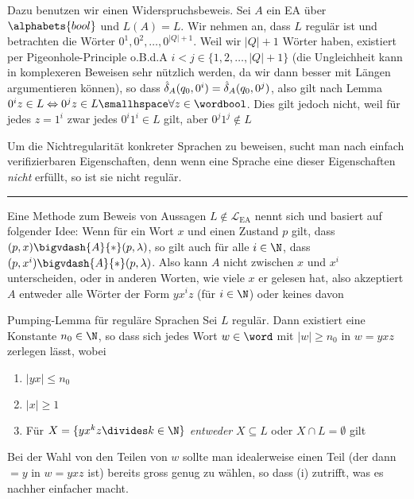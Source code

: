 Dazu benutzen wir einen Widerspruchsbeweis. Sei $A$ ein EA über $\alphabets{bool}$ und $L(A) = L$.
Wir nehmen an, dass $L$ regulär ist und betrachten die Wörter $0^1, 0^2, \ldots, 0^{|Q| + 1}$.
Weil wir $|Q| + 1$ Wörter haben, existiert per Pigeonhole-Principle o.B.d.A $i < j \in \{ 1, 2, \ldots, |Q| + 1 \}$
(die Ungleichheit kann in komplexeren Beweisen sehr nützlich werden, da wir dann besser mit Längen argumentieren können),
so dass $\hat{\delta}_A(q_0, 0^i) = \hat{\delta}_A(q_0, 0^j)$, also gilt nach Lemma $0^i z \in L \Leftrightarrow 0^j z \in L \smallhspace \forall z \in \wordbool$.
Dies gilt jedoch nicht, weil für jedes $z = 1^i$ zwar jedes $0^i 1^i \in L$ gilt, aber $0^j 1^j \notin L$

\numberingOn

Um die Nichtregularität konkreter Sprachen zu beweisen, sucht man nach einfach verifizierbaren Eigenschaften,
denn wenn eine Sprache eine dieser Eigenschaften \textit{nicht} erfüllt, so ist sie nicht regulär.


\vspace{0.3cm}
\hrule
\vspace{0.2cm}


Eine Methode zum Beweis von Aussagen $L \notin \mathcal{L}_{\text{EA}}$ nennt sich  und basiert auf folgender Idee:
Wenn für ein Wort $x$ und einen Zustand $p$ gilt, dass $(p, x) \bigvdash{A}{*} (p, \lambda)$, so gilt auch für alle $i \in \N$, dass $(p, x^i) \bigvdash{A}{*} (p, \lambda)$.
Also kann $A$ nicht zwischen $x$ und $x^i$ unterscheiden, oder in anderen Worten, wie viele $x$ er gelesen hat,
also akzeptiert $A$ entweder alle Wörter der Form $yx^iz$ (für $i \in \N$) oder keines davon

\begin{lemma}[]{Pumping-Lemma für reguläre Sprachen}
    Sei $L$ regulär. Dann existiert eine Konstante $n_0 \in \N$, so dass sich jedes Wort $w \in \word$ mit $|w| \geq n_0$ in $w = yxz$ zerlegen lässt, wobei
    \rmvspace
    \begin{multicols}{2}
        \begin{enumerate}[label=\textit{(\roman*)}]
            \item $|yx| \leq n_0$
            \item $|x| \geq 1$
            \item Für $X = \{ yx^kz \divides k\in \N \}$ \textit{entweder} $X \subseteq L$ oder $X \cap L = \emptyset$ gilt
        \end{enumerate}
    \end{multicols}
\end{lemma}
Bei der Wahl von den Teilen von $w$ sollte man idealerweise einen Teil (der dann $=y$ in $w = yxz$ ist) bereits gross genug zu wählen, so dass (i) zutrifft, was es nachher einfacher macht.

